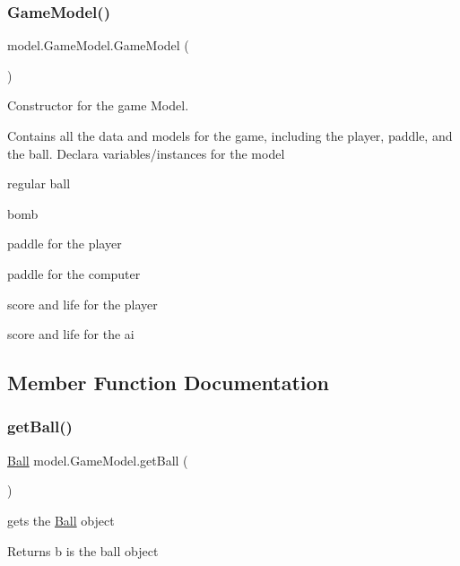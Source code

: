 \subsubsection{\texorpdfstring{Game\+Model()}{GameModel()}}
{\footnotesize\ttfamily model.\+Game\+Model.\+Game\+Model (\begin{DoxyParamCaption}{ }\end{DoxyParamCaption})}



Constructor for the game Model. 

Contains all the data and models for the game, including the player, paddle, and the ball. Declara variables/instances for the model
\begin{DoxyItemize}
\item regular ball
\item bomb
\item paddle for the player
\item paddle for the computer
\item score and life for the player
\item score and life for the ai
\end{DoxyItemize}

\subsection{Member Function Documentation}
\hypertarget{classmodel_1_1_game_model_a8523896367260852dad583e37651f87c}{}\label{classmodel_1_1_game_model_a8523896367260852dad583e37651f87c} 
\subsubsection{\texorpdfstring{get\+Ball()}{getBall()}}
{\footnotesize\ttfamily \hyperlink{classmodel_1_1_ball}{Ball} model.\+Game\+Model.\+get\+Ball (\begin{DoxyParamCaption}{ }\end{DoxyParamCaption})}



gets the \hyperlink{classmodel_1_1_ball}{Ball} object 

\begin{DoxyReturn}{Returns}
b is the ball object 
\end{DoxyReturn}
\hypertarget{classmodel_1_1_game_model_aa53f717eeb13366ffe506363efd1637f}{}\label{classmodel_1_1_game_model_aa53f717eeb13366ffe506363efd1637f} 

